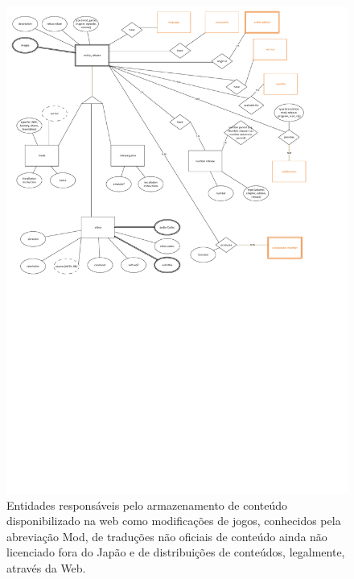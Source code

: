 \documentclass[12pt]{article}
\begin{document}
\begin{figure}[H]
\centering
\includegraphics[height=0.8\textheight,width=1.1\textwidth]{MER_-_Release.pdf}
\caption{Entidades responsáveis pelo armazenamento de conteúdo disponibilizado na web como modificações de jogos, conhecidos pela abreviação Mod, de traduções não oficiais de conteúdo ainda não licenciado fora do Japão e de distribuições de conteúdos, legalmente, através da Web.} \label{Release}
\end{figure}
\end{document}
